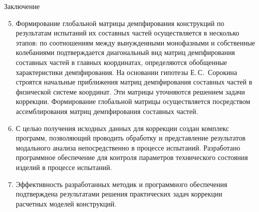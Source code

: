 \begin{frame}{Заключение}
	\begin{enumerate}
		\setcounter{enumi}{4}
		\small
		\item Формирование глобальной матрицы демпфирования конструкций по результатам испытаний их составных частей осуществляется в несколько этапов: по соотношениям между вынужденными монофазными и собственные колебаниями подтверждается диагональный вид матриц демпфирования составных частей в главных координатах, определяются обобщенные характеристики демпфирования. На основании гипотезы Е.\,С.~Сорокина строятся начальные приближения матриц демпфирования составных частей в физической системе координат. Эти матрицы уточняются решением задачи коррекции. Формирование глобальной матрицы осуществляется посредством ассемблирования матриц демпфирования составных частей. 
		\item С целью получения исходных данных для коррекции создан комплекс программ, позволяющий проводить обработку и представление результатов модального анализа непосредственно в процессе испытаний. Разработано программное обеспечение для контроля параметров технического состояния изделий в процессе испытаний.
		\item Эффективность разработанных методик и программного обеспечения подтверждена результатами решения практических задач коррекции расчетных моделей конструкций.
	\end{enumerate}
\end{frame}
